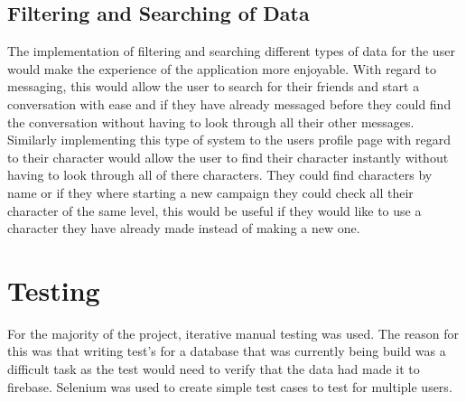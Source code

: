 \subsection{Filtering and Searching of Data}
The implementation of filtering and searching different types of data for the user would make the experience of the application more enjoyable.  With regard to messaging, this would allow the user to search for their friends and start a conversation with ease and if they have already messaged before they could find the conversation without having to look through all their other messages.  Similarly implementing this type of system to the users profile page with regard to their character would allow the user to find their character instantly without having to look through all of there characters.  They could find characters by name or if they where starting a new campaign they could check all their character of the same level, this would be useful if they would like to use a character they have already made instead of making a new one.

\section{Testing}
For the majority of the project,  iterative manual testing was used. The reason for this was that writing test's for a database that was currently being build was a difficult task as the test would need to verify that the data had made it to firebase. Selenium was used to create simple test cases to test for multiple users.
